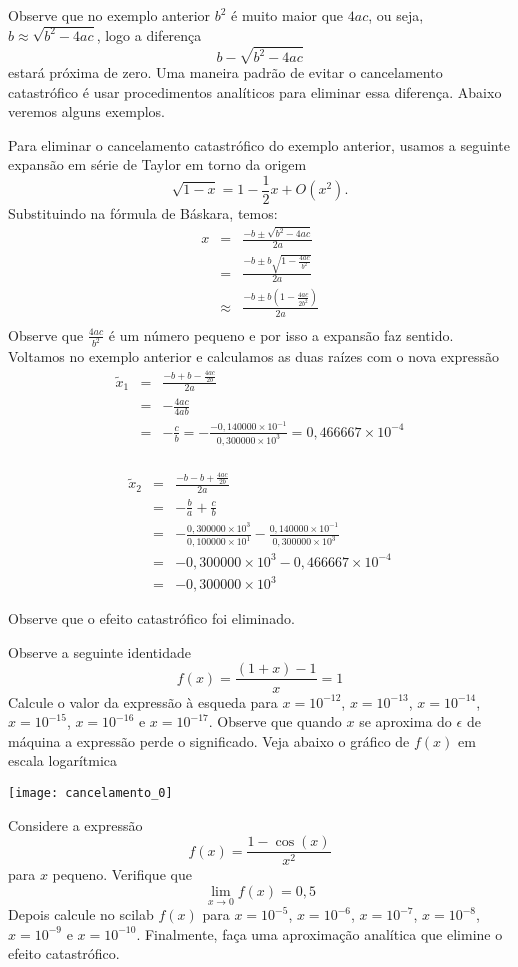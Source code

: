 Observe que no exemplo anterior $b^2$ é muito maior que $4ac$, ou seja, $b\approx \sqrt{b^2-4ac}$, logo a diferença $$b-\sqrt{b^2-4ac}$$ estará próxima de zero. Uma maneira padrão de evitar o cancelamento catastrófico é usar procedimentos analíticos para eliminar essa diferença. Abaixo veremos alguns exemplos.

\begin{ex}Para eliminar o cancelamento catastrófico do exemplo anterior, usamos a seguinte expansão em série de Taylor em torno da origem
$$
\sqrt{1-x}=1-{\frac {1}{2}}x+O(x^2) .
$$
Substituindo na fórmula de Báskara, temos:
\begin{eqnarray*}
x&=&\frac{-b\pm \sqrt{b^2-4ac}}{2a}\\
&=&\frac{-b\pm b\sqrt{1-\frac{4ac}{b^2}}}{2a}\\
&\approx&\frac{-b\pm b\left(1-\frac{4ac}{2b^2}\right)}{2a}\\
\end{eqnarray*}
Observe que $\frac{4ac}{b^2}$ é um número pequeno e por isso a expansão faz sentido. Voltamos no exemplo anterior e calculamos as duas raízes com o nova expressão
\begin{eqnarray*}
\tilde{x}_1&=& \frac{-b+ b-\frac{4ac}{2b}}{2a}\\
&=&-\frac{4ac}{4ab}\\
&=&-\frac{c}{b}=-\frac{-0,140000\times 10^{-1}}{0,300000\times 10^3}=0,466667\times 10^{-4}\\
\end{eqnarray*}

\begin{eqnarray*}
\tilde{x}_2&=& \frac{-b- b+\frac{4ac}{2b}}{2a}\\
&=& -\frac{b}{a}+\frac{c}{b}\\
&=& -\frac{0,300000\times 10^{3}}{0,100000\times 10^{1}}-\frac{0,140000\times 10^{-1}}{0,300000\times 10^3}\\
&=& -0,300000\times 10^{3}-0,466667\times 10^{-4}\\
&=& -0,300000\times 10^{3}
\end{eqnarray*}

Observe que o efeito catastrófico foi eliminado.
\end{ex}
\begin{ex}Observe a seguinte identidade
$$
f(x)=\frac{(1+x)-1}{x}=1
$$
Calcule o valor da expressão à esqueda para $x=10^{-12}$, $x=10^{-13}$, $x=10^{-14}$, $x=10^{-15}$, $x=10^{-16}$ e $x=10^{-17}$. Observe que quando $x$ se aproxima do $\epsilon$ de máquina a expressão perde o significado. Veja abaixo o gráfico de $f(x)$ em escala logarítmica

\texttt{[image: cancelamento\_0]}


\end{ex}
\begin{prob} Considere a expressão
$$
f(x)=\frac{1-\cos(x)}{x^2}
$$
para $x$ pequeno. Verifique que
$$
\lim_{x\to 0}f(x)=0,5
$$
Depois calcule no scilab $f(x)$ para $x=10^{-5}$, $x=10^{-6}$, $x=10^{-7}$, $x=10^{-8}$, $x=10^{-9}$ e $x=10^{-10}$. Finalmente, faça uma aproximação analítica que elimine o efeito catastrófico.
\end{prob}

